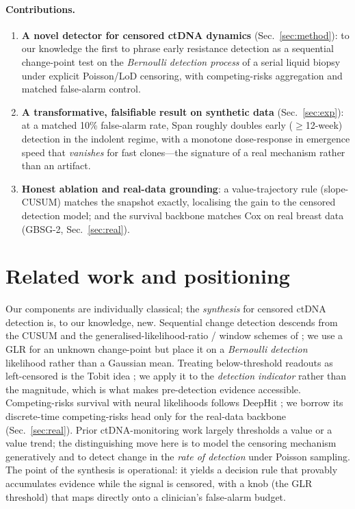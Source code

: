 \documentclass[11pt]{article}
\newcommand{\1}{\mathbf{1}}
\begin{document}
\paragraph{Contributions.}
\begin{enumerate}\itemsep1pt
\item \textbf{A novel detector for censored ctDNA dynamics} (Sec.~\ref{sec:method}):
to our knowledge the first to phrase early resistance detection as a sequential
change-point test on the \emph{Bernoulli detection process} of a serial liquid
biopsy under explicit Poisson/LoD censoring, with competing-risks aggregation and
matched false-alarm control.
\item \textbf{A transformative, falsifiable result on synthetic data}
(Sec.~\ref{sec:exp}): at a matched 10\% false-alarm rate, Span roughly doubles
early ($\geq$12-week) detection in the indolent regime, with a monotone
dose-response in emergence speed that \emph{vanishes} for fast clones---the
signature of a real mechanism rather than an artifact.
\item \textbf{Honest ablation and real-data grounding}: a value-trajectory rule
(slope-CUSUM) matches the snapshot exactly, localising the gain to the censored
detection model; and the survival backbone matches Cox on real breast data
(GBSG-2, Sec.~\ref{sec:real}).
\end{enumerate}

\section{Related work and positioning}
Our components are individually classical; the \emph{synthesis} for censored
ctDNA detection is, to our knowledge, new. Sequential change detection descends
from the CUSUM \citep{page1954} and the generalised-likelihood-ratio / window
schemes of \citet{lorden1971}; we use a GLR for an unknown change-point but place
it on a \emph{Bernoulli detection} likelihood rather than a Gaussian mean.
Treating below-threshold readouts as left-censored is the Tobit idea
\citep{tobit1958}; we apply it to the \emph{detection indicator} rather than the
magnitude, which is what makes pre-detection evidence accessible. Competing-risks
survival with neural likelihoods follows DeepHit \citep{lee2018deephit}; we borrow
its discrete-time competing-risks head only for the real-data backbone
(Sec.~\ref{sec:real}). Prior ctDNA-monitoring work largely thresholds a value or
a value trend; the distinguishing move here is to model the censoring mechanism
generatively and to detect change in the \emph{rate of detection} under Poisson
sampling. The point of the synthesis is operational: it yields a decision rule
that provably accumulates evidence while the signal is censored, with a knob
(the GLR threshold) that maps directly onto a clinician's false-alarm budget.
\end{document}
